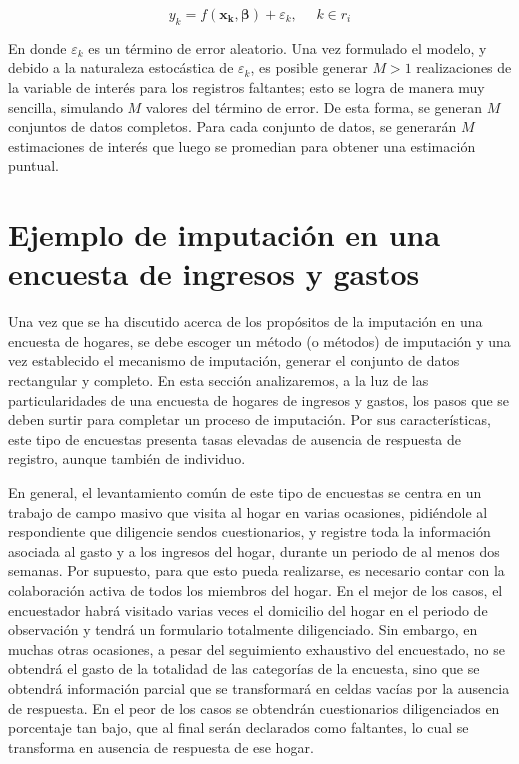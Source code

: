 \documentclass[
  12pt,
]{book}
\begin{document}
\[
y_k = f(\mathbf{x_k},\boldsymbol{\beta}) + \varepsilon_k, \ \ \ \ \ \ k\in r_i
\]

En donde \(\varepsilon_k\) es un término de error aleatorio. Una vez formulado el modelo, y debido a la naturaleza estocástica de \(\varepsilon_k\), es posible generar \(M>1\) realizaciones de la variable de interés para los registros faltantes; esto se logra de manera muy sencilla, simulando \(M\) valores del término de error. De esta forma, se generan \(M\) conjuntos de datos completos. Para cada conjunto de datos, se generarán \(M\) estimaciones de interés que luego se promedian para obtener una estimación puntual.

\hypertarget{ejemplo-de-imputaciuxf3n-en-una-encuesta-de-ingresos-y-gastos}{%
\section{Ejemplo de imputación en una encuesta de ingresos y gastos}\label{ejemplo-de-imputaciuxf3n-en-una-encuesta-de-ingresos-y-gastos}}

Una vez que se ha discutido acerca de los propósitos de la imputación en una encuesta de hogares, se debe escoger un método (o métodos) de imputación y una vez establecido el mecanismo de imputación, generar el conjunto de datos rectangular y completo. En esta sección analizaremos, a la luz de las particularidades de una encuesta de hogares de ingresos y gastos, los pasos que se deben surtir para completar un proceso de imputación. Por sus características, este tipo de encuestas presenta tasas elevadas de ausencia de respuesta de registro, aunque también de individuo.

En general, el levantamiento común de este tipo de encuestas se centra en un trabajo de campo masivo que visita al hogar en varias ocasiones, pidiéndole al respondiente que diligencie sendos cuestionarios, y registre toda la información asociada al gasto y a los ingresos del hogar, durante un periodo de al menos dos semanas. Por supuesto, para que esto pueda realizarse, es necesario contar con la colaboración activa de todos los miembros del hogar. En el mejor de los casos, el encuestador habrá visitado varias veces el domicilio del hogar en el periodo de observación y tendrá un formulario totalmente diligenciado. Sin embargo, en muchas otras ocasiones, a pesar del seguimiento exhaustivo del encuestado, no se obtendrá el gasto de la totalidad de las categorías de la encuesta, sino que se obtendrá información parcial que se transformará en celdas vacías por la ausencia de respuesta. En el peor de los casos se obtendrán cuestionarios diligenciados en porcentaje tan bajo, que al final serán declarados como faltantes, lo cual se transforma en ausencia de respuesta de ese hogar.
\end{document}
